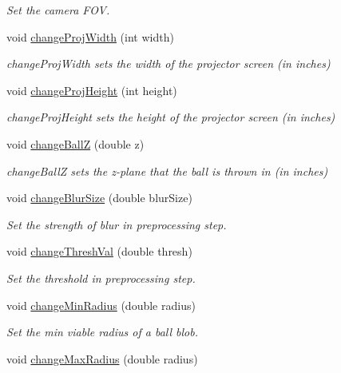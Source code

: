 \begin{DoxyCompactItemize}
\begin{DoxyCompactList}\small\item\em Set the camera F\+OV. \end{DoxyCompactList}\item 
void \hyperlink{classTrackingStream_a679b2d4db152cc3e4f1699179d84724f}{change\+Proj\+Width} (int width)
\begin{DoxyCompactList}\small\item\em change\+Proj\+Width sets the width of the projector screen (in inches) \end{DoxyCompactList}\item 
void \hyperlink{classTrackingStream_a74d1683447659a6d85d5818ee3ee7515}{change\+Proj\+Height} (int height)
\begin{DoxyCompactList}\small\item\em change\+Proj\+Height sets the height of the projector screen (in inches) \end{DoxyCompactList}\item 
void \hyperlink{classTrackingStream_aab0b2d4efe5723d8d71e072013d33ad9}{change\+BallZ} (double z)
\begin{DoxyCompactList}\small\item\em change\+BallZ sets the z-\/plane that the ball is thrown in (in inches) \end{DoxyCompactList}\item 
void \hyperlink{classTrackingStream_a13c95186d09320e6a56b0e072e268728}{change\+Blur\+Size} (double blur\+Size)
\begin{DoxyCompactList}\small\item\em Set the strength of blur in preprocessing step. \end{DoxyCompactList}\item 
void \hyperlink{classTrackingStream_ac8ebcc20a79d5172594a58a623b69fec}{change\+Thresh\+Val} (double thresh)
\begin{DoxyCompactList}\small\item\em Set the threshold in preprocessing step. \end{DoxyCompactList}\item 
void \hyperlink{classTrackingStream_a6f10a83e710693e7100ebaaece3feed3}{change\+Min\+Radius} (double radius)
\begin{DoxyCompactList}\small\item\em Set the min viable radius of a ball blob. \end{DoxyCompactList}\item 
void \hyperlink{classTrackingStream_a4fd621edf60cb02bca056853ff2f9984}{change\+Max\+Radius} (double radius)

\end{DoxyCompactItemize}
